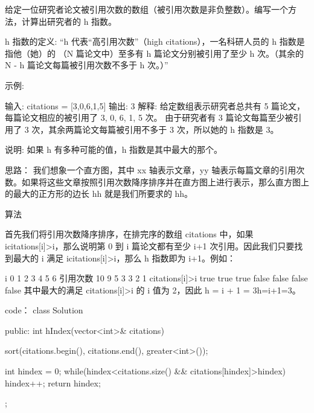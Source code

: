 给定一位研究者论文被引用次数的数组（被引用次数是非负整数）。编写一个方法，计算出研究者的 h 指数。

h 指数的定义: “h 代表“高引用次数”（high citations），一名科研人员的 h 指数是指他（她）的 （N 篇论文中）至多有 h 篇论文分别被引用了至少 h 次。（其余的 N - h 篇论文每篇被引用次数不多于 h 次。）”

 

示例:

输入: citations = [3,0,6,1,5]
输出: 3 
解释: 给定数组表示研究者总共有 5 篇论文，每篇论文相应的被引用了 3, 0, 6, 1, 5 次。
     由于研究者有 3 篇论文每篇至少被引用了 3 次，其余两篇论文每篇被引用不多于 3 次，所以她的 h 指数是 3。
 

说明: 如果 h 有多种可能的值，h 指数是其中最大的那个。



























思路：
我们想象一个直方图，其中 xx 轴表示文章，yy 轴表示每篇文章的引用次数。如果将这些文章按照引用次数降序排序并在直方图上进行表示，那么直方图上的最大的正方形的边长 hh 就是我们所要求的 hh。



算法

首先我们将引用次数降序排序，在排完序的数组 citations 中，如果 icitations[i]>i，那么说明第 0 到 i 篇论文都有至少 i+1 次引用。因此我们只要找到最大的 i 满足 icitations[i]>i，那么 h 指数即为 i+1。例如：

i				 0	  1	   2	   3	    4   	 5	   6
引用次数			10	  9	   5	   3	    3	      2 	   1 
citations[i]>i		true	 true	 true	 false  false	false  false
其中最大的满足 citations[i]>i 的 i 值为 2，因此 h = i + 1 = 3h=i+1=3。






























code：
class Solution {
public:
    int hIndex(vector<int>& citations) {
    sort(citations.begin(), citations.end(), greater<int>());

    int hindex = 0;
    while(hindex<citations.size() && citations[hindex]>hindex)
        hindex++;
    return hindex;
}
};